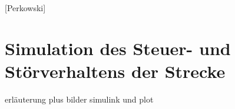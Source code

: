 
\newpage

[Perkowski]\\
\section{Simulation des Steuer- und Störverhaltens der Strecke}

erläuterung plus bilder simulink und plot